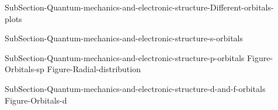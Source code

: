 \documentclass[main.tex]{subfiles}
\begin{document}
\begin{description}
\item[] {SubSection-Quantum-mechanics-and-electronic-structure-Different-orbitals-plots}
\item[] {SubSection-Quantum-mechanics-and-electronic-structure-s-orbitals} 
\item[] {SubSection-Quantum-mechanics-and-electronic-structure-p-orbitals}
 {Figure-Orbitals-sp}
{Figure-Radial-distribution}

\item[] {SubSection-Quantum-mechanics-and-electronic-structure-d-and-f-orbitals}
{Figure-Orbitals-d}





\end{description}
\end{document}
